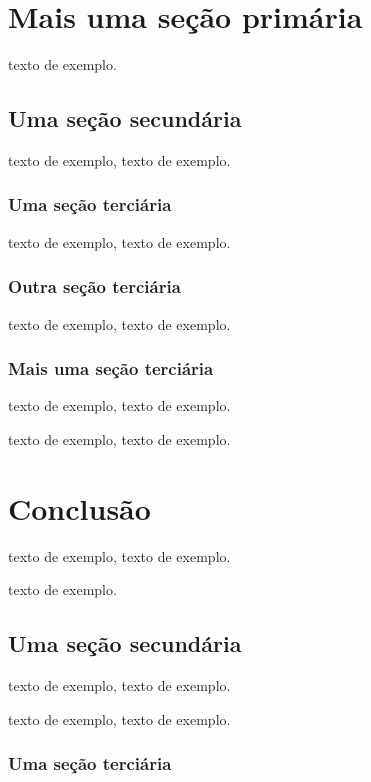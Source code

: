 \documentclass[
	12pt,				%
	oneside,			%
	a4paper,			%
	english,			%
	brazil				%
	]{abntex2ppgsi}
\begin{document}
\chapter{Mais uma seção primária}


 texto de exemplo.

\section{Uma seção secundária}

 texto de exemplo, texto de exemplo.

\subsection{Uma seção terciária}

 texto de exemplo, texto de exemplo.


\subsection{Outra seção terciária}

 texto de exemplo, texto de exemplo.

\subsection{Mais uma seção terciária}

 texto de exemplo, texto de exemplo.

 texto de exemplo, texto de exemplo.


\chapter{Conclusão}

 texto de exemplo, texto de exemplo.

 texto de exemplo.

\section{Uma seção secundária}

 texto de exemplo, texto de exemplo.

 texto de exemplo, texto de exemplo.

\subsection{Uma seção terciária}
\end{document}
